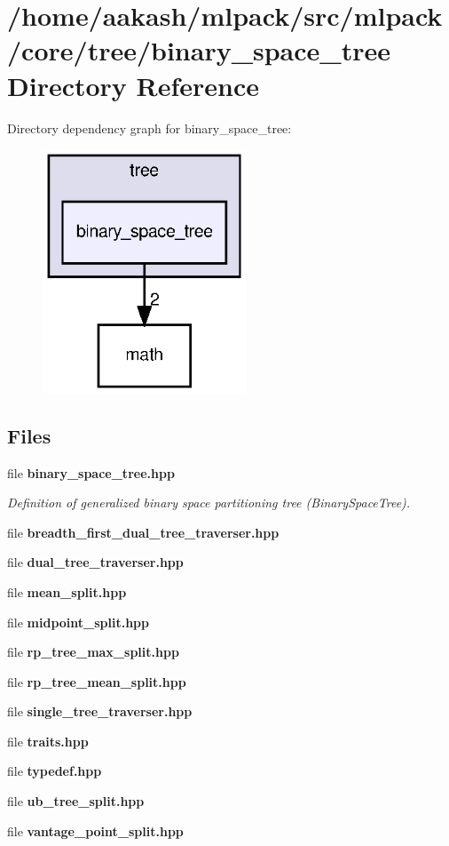 \section{/home/aakash/mlpack/src/mlpack/core/tree/binary\+\_\+space\+\_\+tree Directory Reference}
\label{dir_f2c902aa2e0a74bdfe4e54224fb2267f}
Directory dependency graph for binary\+\_\+space\+\_\+tree\+:
\nopagebreak
\begin{figure}[H]
\begin{center}
\leavevmode
\includegraphics[width=172pt]{dir_f2c902aa2e0a74bdfe4e54224fb2267f_dep}
\end{center}
\end{figure}
\subsection*{Files}
\begin{DoxyCompactItemize}
\item 
file \textbf{ binary\+\_\+space\+\_\+tree.\+hpp}
\begin{DoxyCompactList}\small\item\em Definition of generalized binary space partitioning tree (Binary\+Space\+Tree). \end{DoxyCompactList}\item 
file \textbf{ breadth\+\_\+first\+\_\+dual\+\_\+tree\+\_\+traverser.\+hpp}
\item 
file \textbf{ dual\+\_\+tree\+\_\+traverser.\+hpp}
\item 
file \textbf{ mean\+\_\+split.\+hpp}
\item 
file \textbf{ midpoint\+\_\+split.\+hpp}
\item 
file \textbf{ rp\+\_\+tree\+\_\+max\+\_\+split.\+hpp}
\item 
file \textbf{ rp\+\_\+tree\+\_\+mean\+\_\+split.\+hpp}
\item 
file \textbf{ single\+\_\+tree\+\_\+traverser.\+hpp}
\item 
file \textbf{ traits.\+hpp}
\item 
file \textbf{ typedef.\+hpp}
\item 
file \textbf{ ub\+\_\+tree\+\_\+split.\+hpp}
\item 
file \textbf{ vantage\+\_\+point\+\_\+split.\+hpp}
\end{DoxyCompactItemize}
